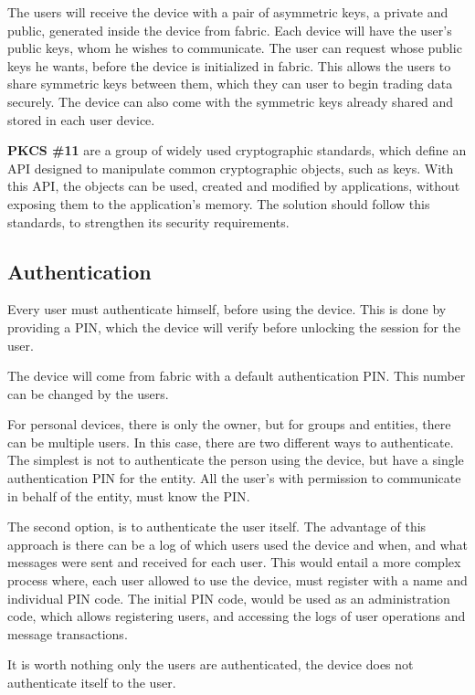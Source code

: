 The users will receive the device with a pair of asymmetric keys, a private and public, generated inside the device from fabric. Each device will have the user's public keys, whom he wishes to communicate. The user can request whose public keys he wants, before the device is initialized in fabric. This allows the users to share symmetric keys between them, which they can user to begin trading data securely. The device can also come with the symmetric keys already shared and stored in each user device.

\textbf{\ac{PKCS} \#11} are a group of widely used cryptographic standards, which define an \ac{API} designed to manipulate common cryptographic objects, such as keys.
With this \ac{API}, the objects can be used, created and modified by applications, without exposing them to the application's memory.
The solution should follow this standards, to strengthen its security requirements.

\subsection{Authentication}\label{chap:problem:services:auth}
Every user must authenticate himself, before using the device. This is done by providing a \ac{PIN}, which the device will verify before unlocking the session for the user.

The device will come from fabric with a default authentication \ac{PIN}. This number can be changed by the users.

For personal devices, there is only the owner, but for groups and entities, there can be multiple users. In this case, there are two different ways to authenticate. The simplest is not to authenticate the person using the device, but have a single authentication \ac{PIN} for the entity. All the user's with permission to communicate in behalf of the entity, must know the \ac{PIN}.

The second option, is to authenticate the user itself. The advantage of this approach is there can be a log of which users used the device and when, and what messages were sent and received for each user.
This would entail a more complex process where, each user allowed to use the device, must register with a name and individual \ac{PIN} code. The initial \ac{PIN} code, would be used as an administration code, which allows registering users, and accessing the logs of user operations and message transactions.

It is worth nothing only the users are authenticated, the device does not authenticate itself to the user.

